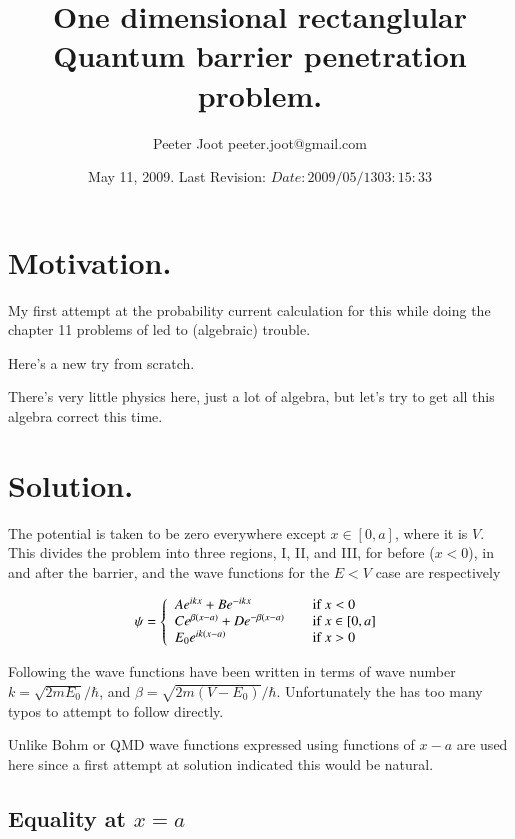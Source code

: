 \documentclass{article}
\title{ One dimensional rectanglular Quantum barrier penetration problem. }
\author{Peeter Joot \quad peeter.joot@gmail.com }
\date{ May 11, 2009.  Last Revision: $Date: 2009/05/13 03:15:33 $ }
\begin{document}
\maketitle{}
\tableofcontents
\section{ Motivation. }

My first attempt at the probability current calculation for this
while doing the chapter 11 problems of \cite{bohm1989qt} led to (algebraic) trouble.

Here's a new try from scratch.

There's very little physics here, just a lot of algebra, but let's try
to get all this algebra correct this time.

\section{ Solution. }

The potential is taken to be zero everywhere except $x \in [0,a]$, where it is
$V$.  This divides the problem into three regions, I, II, and III, for 
before ($x<0$), in and after the barrier, and the wave functions for the 
$E <V$ case are respectively

\begin{equation}
\psi =
\left\{
\begin{array}{l l}
A e^{i k x} + B e^{-i k x} & \quad \mbox{if $x <0$} \\
C e^{ \beta(x-a)} + D e^{ -\beta(x-a)} & \quad \mbox{if $x \in [0,a]$} \\
E_0 e^{i k(x-a)} & \quad \mbox{if $x >0$} \\
\end{array}
\right.
\end{equation}

Following \cite{mcmahon2005qmd} the wave functions have been written in terms of wave number 
$k = \sqrt{2 m E_0}/\hbar$, and $\beta = \sqrt{2 m (V-E_0)}/\hbar$.  Unfortunately the 
\cite{mcmahon2005qmd} has too many typos to attempt to follow directly.

Unlike Bohm or QMD wave functions expressed using functions of $x-a$ are used here since a first
attempt at solution indicated this would be natural.

\subsection{ Equality at $x=a$ }
\end{document}
